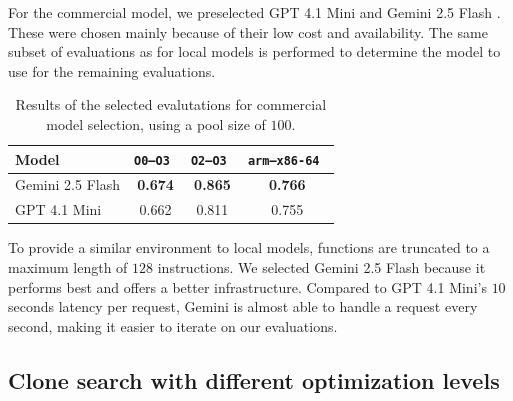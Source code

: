 For the commercial model, we preselected GPT 4.1 Mini \cite{gpt4} and Gemini 2.5 Flash \cite{gemini2.5}.
These were chosen mainly because of their low cost and availability. The same subset of evaluations as for local models is performed to determine
the model to use for the remaining evaluations.
{
    \renewcommand{\arraystretch}{1.1}
    \begin{table}[h]
    \centering
    \begin{tabular}{|l|ccc|} \hline
    Model            & \tt O0--O3 & \tt O2--O3 & \tt arm--x86-64 \\ \hline
    Gemini 2.5 Flash & \bf 0.674  & \bf 0.865  & \bf 0.766        \\
    GPT 4.1 Mini     & 0.662      & 0.811      & 0.755            \\ \hline
    \end{tabular}
    \caption{Results of the selected evalutations for commercial model selection, using a pool size of \(100\).}
    \end{table}
}

To provide a similar environment to local models, functions are truncated to a maximum length of \(128\) instructions.
We selected Gemini 2.5 Flash because it performs best and offers a better infrastructure. Compared to GPT 4.1 Mini's \(10\) seconds
latency per request, Gemini is almost able to handle a request every second, making it easier to iterate on our evaluations.

\subsection{Clone search with different optimization levels}

